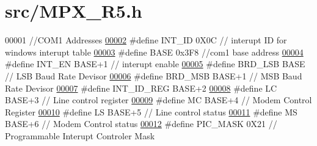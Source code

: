 \hypertarget{_m_p_x___r5_8h_source}{
\section{src/MPX\_\-R5.h}
}

\begin{DoxyCode}
00001         \textcolor{comment}{//COM1 Addresses }
\hypertarget{_m_p_x___r5_8h_source_l00002}{}\hyperlink{_m_p_x___r5_8h_a57912ff27e6b123b86821203a0338760}{00002} \textcolor{preprocessor}{#define INT\_ID 0X0C // interupt ID for windows interupt table}
\hypertarget{_m_p_x___r5_8h_source_l00003}{}\hyperlink{_m_p_x___r5_8h_a79bcfb6bde984f42d1124b068a509af7}{00003} \textcolor{preprocessor}{}\textcolor{preprocessor}{#define BASE 0x3F8  //com1 base address}
\hypertarget{_m_p_x___r5_8h_source_l00004}{}\hyperlink{_m_p_x___r5_8h_a8dc8a6ba32861f0a3cbd89fa1ec0d216}{00004} \textcolor{preprocessor}{}\textcolor{preprocessor}{#define INT\_EN BASE+1  // interupt enable}
\hypertarget{_m_p_x___r5_8h_source_l00005}{}\hyperlink{_m_p_x___r5_8h_a4c32fec003a7f9e7fefc8b8b1f237dd8}{00005} \textcolor{preprocessor}{}\textcolor{preprocessor}{#define BRD\_LSB BASE // LSB Baud Rate Devisor}
\hypertarget{_m_p_x___r5_8h_source_l00006}{}\hyperlink{_m_p_x___r5_8h_aa071df7caa6499a431c734cc5adde587}{00006} \textcolor{preprocessor}{}\textcolor{preprocessor}{#define BRD\_MSB BASE+1 // MSB Baud Rate Devisor}
\hypertarget{_m_p_x___r5_8h_source_l00007}{}\hyperlink{_m_p_x___r5_8h_a2d1977759194644a0f9d516c4aed28d5}{00007} \textcolor{preprocessor}{}\textcolor{preprocessor}{#define INT\_ID\_REG BASE+2}
\hypertarget{_m_p_x___r5_8h_source_l00008}{}\hyperlink{_m_p_x___r5_8h_aa499bb75bb504909cd0a72baf48c4653}{00008} \textcolor{preprocessor}{}\textcolor{preprocessor}{#define LC BASE+3 // Line control register}
\hypertarget{_m_p_x___r5_8h_source_l00009}{}\hyperlink{_m_p_x___r5_8h_a71d9e511e7e302cd831e83581219e70d}{00009} \textcolor{preprocessor}{}\textcolor{preprocessor}{#define MC BASE+4 // Modem Control Register}
\hypertarget{_m_p_x___r5_8h_source_l00010}{}\hyperlink{_m_p_x___r5_8h_aeb0ce037090c628feafc65349031b214}{00010} \textcolor{preprocessor}{}\textcolor{preprocessor}{#define LS BASE+5 // Line control status}
\hypertarget{_m_p_x___r5_8h_source_l00011}{}\hyperlink{_m_p_x___r5_8h_ab9e061e05d689a5769936b213022102f}{00011} \textcolor{preprocessor}{}\textcolor{preprocessor}{#define MS BASE+6 // Modem Control status}
\hypertarget{_m_p_x___r5_8h_source_l00012}{}\hyperlink{_m_p_x___r5_8h_a89831dd7cb646bfa61461e0b1d91add7}{00012} \textcolor{preprocessor}{}\textcolor{preprocessor}{#define PIC\_MASK 0X21 // Programmable Interupt Controler Mask}

\end{DoxyCode}
